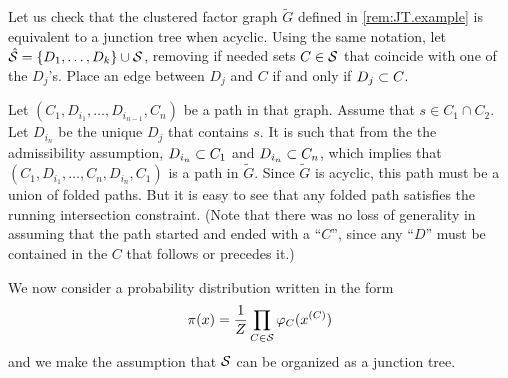 \begin{remark}
\label{rem:JT.example.2}

Let us check that the clustered factor graph $\tilde G$ defined in \cref{rem:JT.example} is equivalent to a junction tree when acyclic. 
Using the same
notation, let $\hat {{\mathcal S}} = \{D_1, \ldots, D_k\}\cup {\mathcal S}$, removing if needed sets $C\in {\mathcal S}$ that coincide with one of the $D_j$'s.  Place an edge between $D_j$ and $C$ if and only if $D_j \subset C$. 

Let
$(C_1, D_{i_1}, \ldots, D_{i_{n-1}}, C_n)$ be a path
in that graph. Assume that $s\in C_1\cap C_2$. Let $D_{i_n}$ be the unique $D_j$ that contains $s$. It is such that from the  the admissibility assumption, $D_{i_n} \subset C_1$ and $D_{i_n} \subset C_n$, which implies that $(C_1, D_{i_1}, \ldots, C_n, D_{i_n}, C_1)$ is a path in $\tilde G$. Since $\tilde G$ is acyclic, this path must be a union of folded paths. But it is easy to see that any folded path satisfies the running intersection constraint.  (Note that there was no loss of generality in assuming that the path started and ended with a ``$C$'', since any ``$D$'' must be contained in the $C$ that follows or precedes it.)
\end{remark}


We now consider a probability distribution written in
the form
\[
\pi(x) = \frac1Z \prod_{C\in{\mathcal S}} \varphi_C(x^{(C)})
\]
and we  make the assumption that ${\mathcal S}$ can be organized as a
junction  tree.


